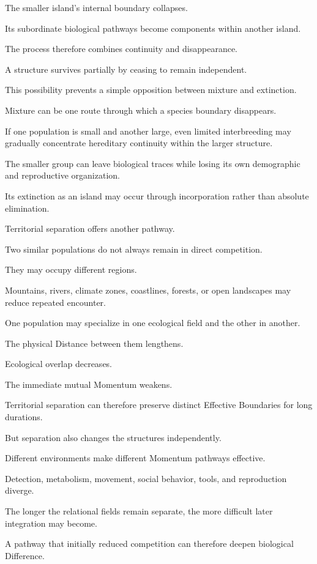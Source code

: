 The smaller island’s internal boundary collapses.

Its subordinate biological pathways become components within another island.

The process therefore combines continuity and disappearance.

A structure survives partially by ceasing to remain independent.

This possibility prevents a simple opposition between mixture and extinction.

Mixture can be one route through which a species boundary disappears.

If one population is small and another large, even limited interbreeding may gradually concentrate hereditary continuity within the larger structure.

The smaller group can leave biological traces while losing its own demographic and reproductive organization.

Its extinction as an island may occur through incorporation rather than absolute elimination.

Territorial separation offers another pathway.

Two similar populations do not always remain in direct competition.

They may occupy different regions.

Mountains, rivers, climate zones, coastlines, forests, or open landscapes may reduce repeated encounter.

One population may specialize in one ecological field and the other in another.

The physical Distance between them lengthens.

Ecological overlap decreases.

The immediate mutual Momentum weakens.

Territorial separation can therefore preserve distinct Effective Boundaries for long durations.

But separation also changes the structures independently.

Different environments make different Momentum pathways effective.

Detection, metabolism, movement, social behavior, tools, and reproduction diverge.

The longer the relational fields remain separate, the more difficult later integration may become.

A pathway that initially reduced competition can therefore deepen biological Difference.

